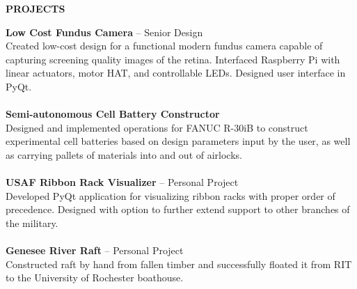 \documentclass[11pt]{article}
\newcommand{\leftColSize}{0.22}		%
\newcommand{\rightColSize}{0.78}	%
\begin{document}
\begin{center}
\begin{minipage}[t]{\leftColSize\textwidth}
\textbf{PROJECTS}
\end{minipage}%
\begin{minipage}[t]{\rightColSize\textwidth}
\textbf{Low Cost Fundus Camera} -- Senior Design\\
Created low-cost design for a functional modern fundus camera capable of capturing screening quality images of the retina. Interfaced Raspberry Pi with linear actuators, motor HAT, and controllable LEDs. Designed user interface in PyQt.\\\\
\textbf{Semi-autonomous Cell Battery Constructor}\\
Designed and implemented operations for FANUC R-30iB to construct experimental cell batteries based on design parameters input by the user, as well as carrying pallets of materials into and out of airlocks.\\\\
\textbf{USAF Ribbon Rack Visualizer} -- Personal Project\\
Developed PyQt application for visualizing ribbon racks with proper order of precedence. Designed with option to further extend support to other branches of the military.\\\\
\textbf{Genesee River Raft} -- Personal Project\\
Constructed raft by hand from fallen timber and successfully floated it from RIT to the University of Rochester boathouse.
\end{minipage}
\end{center}
\end{document}
